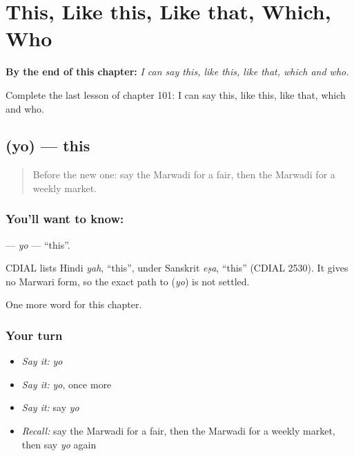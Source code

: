 
\chapter{This, Like this, Like that, Which, Who}
\label{ch:mw-this-like-this-like-that-which-who}

\begin{chapteropening}
\textbf{By the end of this chapter:} \emph{I can say this, like this, like that, which and who.}

Complete the last lesson of chapter 101: I can say this, like this, like that, which and who.
\end{chapteropening}

\section[\texorpdfstring{\mw{यो} (yo)}{यो (yo)}]{ (yo) — this}

\label{lesson:MW-C101-yo}



\begin{quote}
Before the new one: say the Marwadi for a fair, then the Marwadi for a weekly market.
\end{quote}

\subsection*{You'll want to know: }
\textbf{} — \emph{yo} — \textquotedblleft{}this\textquotedblright{}.

\begin{cousinweb}
CDIAL lists Hindi \emph{yah}, \textquotedblleft{}this\textquotedblright{}, under Sanskrit \emph{eṣa}, \textquotedblleft{}this\textquotedblright{} (CDIAL 2530). It gives no Marwari form, so the exact path to \textbf{} (\emph{yo}) is not settled.
\end{cousinweb}

\begin{grammarlens}[title={What you've built}]
One more word for this chapter.
\end{grammarlens}

\subsection*{Your turn}
\begin{itemize}
\raggedright
  \item \emph{Say it:} \emph{yo}
  \item \emph{Say it:} \emph{yo}, once more
  \item \emph{Say it:} say \emph{yo}
  \item \emph{Recall:} say the Marwadi for a fair, then the Marwadi for a weekly market, then say \emph{yo} again
\end{itemize}

